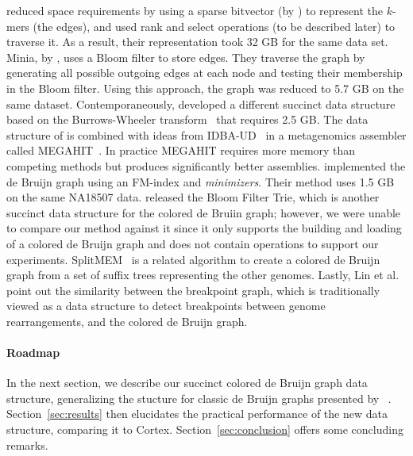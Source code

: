  \cite{conway} reduced space requirements by using a sparse bitvector  (by \cite{bitvector}) to represent the $k$-mers (the edges), and used rank and select operations (to be described later) to traverse it. As a result, their representation took 32 GB for the same data set.  Minia, by \cite{wabi}, uses a Bloom filter to store edges. They traverse the graph by generating all possible outgoing edges at each node and testing their membership in the Bloom filter. Using this approach, the graph was reduced to 5.7 GB on the same dataset.  Contemporaneously, \cite{BOSS12} developed a different succinct data structure based on the Burrows-Wheeler transform~\citep{BW94} that requires 2.5 GB.  The data structure of \cite{BOSS12} is combined with ideas from IDBA-UD~\citep{idbaud} in a metagenomics assembler called MEGAHIT~\citep{megahit}.  In practice MEGAHIT requires more memory than competing methods  but produces significantly better assemblies.   \cite{paul} implemented the de Bruijn graph using an FM-index and {\em minimizers}.   Their method uses 1.5 GB on the same NA18507 data.  \cite{BFT} released the Bloom Filter Trie, which is another succinct data structure for the colored de Bruiin graph; however, we were unable to compare our method against it since  it only supports the building and loading of a colored de Bruijn graph and does not contain operations to support our experiments.  SplitMEM~\citep{splitmem} is a related algorithm to create a colored de Bruijn graph from a set of suffix trees representing the other genomes. Lastly, Lin et al. \citep{Lin} point out the similarity between the breakpoint graph, which is traditionally viewed as a data structure to detect breakpoints between genome rearrangements, and the colored de Bruijn graph. 
 

\paragraph{Roadmap} In the next section, we describe our succinct colored de Bruijn graph data structure, generalizing the stucture for classic de Bruijn graphs presented by ~\cite{BOSS12}. Section~\ref{sec:results} then elucidates the practical performance of the new data structure, comparing it to {\sc Cortex}. Section~\ref{sec:conclusion} offers some concluding remarks.

